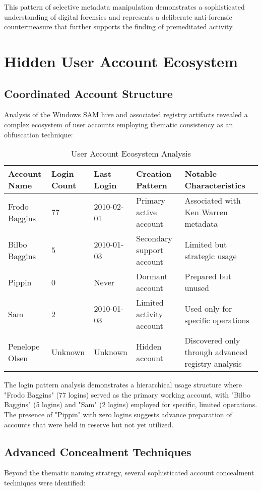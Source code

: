 This pattern of selective metadata manipulation demonstrates a sophisticated understanding of digital forensics and represents a deliberate anti-forensic countermeasure that further supports the finding of premeditated activity.

\section{Hidden User Account Ecosystem}
\subsection{Coordinated Account Structure}
Analysis of the Windows SAM hive and associated registry artifacts revealed a complex ecosystem of user accounts employing thematic consistency as an obfuscation technique:

\begin{table}[htbp]
\centering
\small
\begin{tabular}{|p{2cm}|p{2cm}|p{3cm}|p{3cm}|p{3cm}|}
\hline
\textbf{Account Name} & \textbf{Login Count} & \textbf{Last Login} & \textbf{Creation Pattern} & \textbf{Notable Characteristics} \\
\hline
Frodo Baggins & 77 & 2010-02-01 & Primary active account & Associated with Ken Warren metadata \\
\hline
Bilbo Baggins & 5 & 2010-01-03 & Secondary support account & Limited but strategic usage \\
\hline
Pippin & 0 & Never & Dormant account & Prepared but unused \\
\hline
Sam & 2 & 2010-01-03 & Limited activity account & Used only for specific operations \\
\hline
Penelope Olsen & Unknown & Unknown & Hidden account & Discovered only through advanced registry analysis \\
\hline
\end{tabular}
\caption{User Account Ecosystem Analysis}
\label{table:account_ecosystem}
\end{table}

The login pattern analysis demonstrates a hierarchical usage structure where "Frodo Baggins" (77 logins) served as the primary working account, with "Bilbo Baggins" (5 logins) and "Sam" (2 logins) employed for specific, limited operations. The presence of "Pippin" with zero logins suggests advance preparation of accounts that were held in reserve but not yet utilized.

\subsection{Advanced Concealment Techniques}
Beyond the thematic naming strategy, several sophisticated account concealment techniques were identified:

